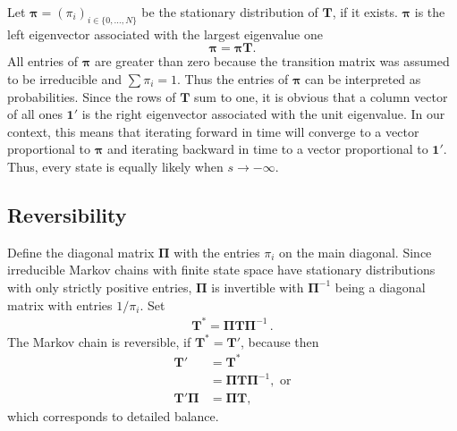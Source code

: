 \documentclass[preprint]{elsarticle}
\newcommand{\bs}[1]{\ensuremath{\boldsymbol{#1}}}
\newcommand\given{{\,|\,}}
\newcommand\ie{{\it i.e.,}}
\newcommand\x[1]{\ensuremath{X_{#1}}}
\newcommand\oneC{\ensuremath{\mathbf{1}'}}
\newcommand\oneR{\ensuremath{\mathbf{1}}}
\begin{document}
Let $\bs{\pi} = (\pi_i)_{i \in \{0,\ldots,N\}}$ be the stationary distribution of $\mathbf{T}$, if it exists. $\bs{\pi}$ is the left eigenvector associated with the largest eigenvalue one~\citep[][p. 87]{Ewen04}
\begin{equation}\label{eq:stationary}
\bs{\pi}=\bs{\pi}\mathbf{T}.
\end{equation}
All entries of $\bs{\pi}$ are greater than zero because the transition matrix was assumed to be irreducible and $\sum \pi_i = 1$. Thus the entries of $\bs{\pi}$ can be interpreted as probabilities. Since the rows of $\mathbf{T}$ sum to one, it is obvious that a column vector of all ones $\oneC$ is the right eigenvector associated with the unit eigenvalue. In our context, this means that iterating forward in time will converge to a vector proportional to $\bs{\pi}$ and iterating backward in time to a vector proportional to $\oneC$. Thus, every state is equally likely when  $s\to-\infty$. %

\subsection{Reversibility}

Define the diagonal matrix $\mathbf{\Pi}$ with the entries $\pi_i$ on the main diagonal. Since irreducible Markov chains with finite state space have stationary distributions with only strictly positive entries, $\mathbf{\Pi}$ is invertible with $\mathbf{\Pi}^{-1}$ being a diagonal matrix with entries $1/\pi_i$.  Set
\begin{equation}\label{eq:reverse_transition}
\begin{split}
\mathbf{T}^{*}=\mathbf{\Pi}\mathbf{T}\mathbf{\Pi}^{-1}\,.
\end{split}
\end{equation}
The Markov chain is reversible, if $\mathbf{T}^{*}=\mathbf{T}'$, because then
\begin{equation}\label{eq:detailed_balance}
\begin{split}
  \mathbf{T}' &= \mathbf{T}^{*} \\
             &= \mathbf{\Pi}\mathbf{T}\mathbf{\Pi}^{-1}, \text{ or} \\
  \mathbf{T}'\mathbf{\Pi} &= \mathbf{\Pi T},
\end{split}
\end{equation}
which corresponds to detailed balance.
\end{document}
